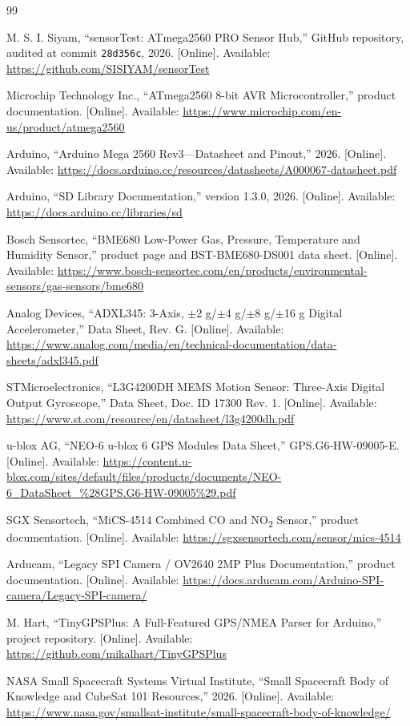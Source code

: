 \documentclass[11pt,a4paper]{article}
\newcommand{\code}[1]{\texttt{#1}}
\begin{document}
\clearpage
\sloppy
\raggedright
\begin{thebibliography}{99}

M. S. I. Siyam, ``sensorTest: ATmega2560 PRO Sensor Hub,'' GitHub repository, audited at commit \code{28d356c}, 2026. [Online]. Available: \url{https://github.com/SISIYAM/sensorTest}

Microchip Technology Inc., ``ATmega2560 8-bit AVR Microcontroller,'' product documentation. [Online]. Available: \url{https://www.microchip.com/en-us/product/atmega2560}

Arduino, ``Arduino Mega 2560 Rev3---Datasheet and Pinout,'' 2026. [Online]. Available: \url{https://docs.arduino.cc/resources/datasheets/A000067-datasheet.pdf}

Arduino, ``SD Library Documentation,'' version 1.3.0, 2026. [Online]. Available: \url{https://docs.arduino.cc/libraries/sd}

Bosch Sensortec, ``BME680 Low-Power Gas, Pressure, Temperature and Humidity Sensor,'' product page and BST-BME680-DS001 data sheet. [Online]. Available: \url{https://www.bosch-sensortec.com/en/products/environmental-sensors/gas-sensors/bme680}

Analog Devices, ``ADXL345: 3-Axis, $\pm$2 g/$\pm$4 g/$\pm$8 g/$\pm$16 g Digital Accelerometer,'' Data Sheet, Rev. G. [Online]. Available: \url{https://www.analog.com/media/en/technical-documentation/data-sheets/adxl345.pdf}

STMicroelectronics, ``L3G4200DH MEMS Motion Sensor: Three-Axis Digital Output Gyroscope,'' Data Sheet, Doc. ID 17300 Rev. 1. [Online]. Available: \url{https://www.st.com/resource/en/datasheet/l3g4200dh.pdf}

u-blox AG, ``NEO-6 u-blox 6 GPS Modules Data Sheet,'' GPS.G6-HW-09005-E. [Online]. Available: \url{https://content.u-blox.com/sites/default/files/products/documents/NEO-6_DataSheet_%28GPS.G6-HW-09005%29.pdf}

SGX Sensortech, ``MiCS-4514 Combined CO and NO\textsubscript{2} Sensor,'' product documentation. [Online]. Available: \url{https://sgxsensortech.com/sensor/mics-4514}

Arducam, ``Legacy SPI Camera / OV2640 2MP Plus Documentation,'' product documentation. [Online]. Available: \url{https://docs.arducam.com/Arduino-SPI-camera/Legacy-SPI-camera/}

M. Hart, ``TinyGPSPlus: A Full-Featured GPS/NMEA Parser for Arduino,'' project repository. [Online]. Available: \url{https://github.com/mikalhart/TinyGPSPlus}

NASA Small Spacecraft Systems Virtual Institute, ``Small Spacecraft Body of Knowledge and CubeSat 101 Resources,'' 2026. [Online]. Available: \url{https://www.nasa.gov/smallsat-institute/small-spacecraft-body-of-knowledge/}

\end{thebibliography}
\end{document}
